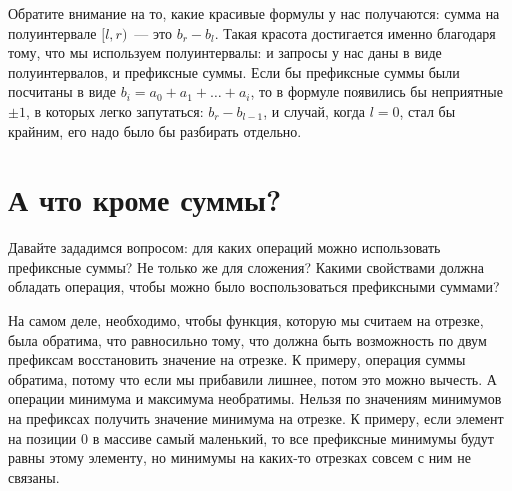 
\begin{observation}
    Обратите внимание на то, какие красивые формулы у нас получаются: сумма на полуинтервале $[l, r)$~--- это $b_r - b_l$. Такая красота достигается именно благодаря тому, что мы используем полуинтервалы: и запросы у нас даны в виде полуинтервалов, и префиксные суммы. Если бы префиксные суммы были посчитаны в виде $b_i = a_0 + a_1 + \ldots + a_i$, то в формуле появились бы неприятные $\pm 1$, в которых легко запутаться: $b_r - b_{l - 1}$, и случай, когда $l = 0$, стал бы крайним, его надо было бы разбирать отдельно.
\end{observation}

\section{А что кроме суммы?}

Давайте зададимся вопросом: для каких операций можно использовать префиксные суммы? Не только же для сложения? Какими свойствами должна обладать операция, чтобы можно было воспользоваться префиксными суммами?

На самом деле, необходимо, чтобы функция, которую мы считаем на отрезке, была обратима, что равносильно тому, что должна быть возможность по двум префиксам восстановить значение на отрезке. К примеру, операция суммы обратима, потому что если мы прибавили лишнее, потом это можно вычесть. А операции минимума и максимума необратимы. Нельзя по значениям минимумов на префиксах получить значение минимума на отрезке. К примеру, если элемент на позиции $0$ в массиве самый маленький, то все префиксные минимумы будут равны этому элементу, но минимумы на каких-то отрезках совсем с ним не связаны.


\


